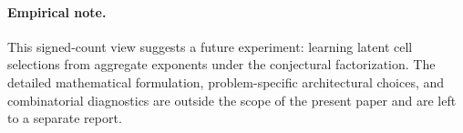 \paragraph{Empirical note.}
This signed-count view suggests a future experiment: learning latent cell selections from aggregate exponents under the conjectural factorization.
The detailed mathematical formulation, problem-specific architectural choices, and combinatorial diagnostics are outside the scope of the present paper and are left to a separate report.
